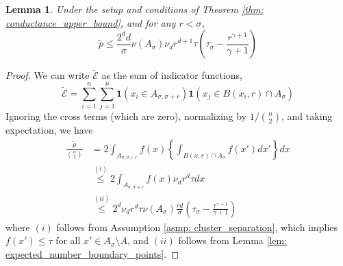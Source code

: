 \documentclass{article}
\newcommand{\Asig}{A_{\sigma}}
\newcommand{\Asigr}{A_{\sigma,\sigma + r}}
\newcommand{\1}{\mathbf{1}}
\theoremstyle{aldenthm}
\newtheorem{lemma}{Lemma}
\begin{document}
\begin{lemma}
	\label{lem: expected_density_cut}
	Under the setup and conditions of Theorem \ref{thm: conductance_upper_bound}, and for any $r < \sigma$,
	\begin{equation*}
	\widetilde{p} \leq \frac{2^d d}{\sigma} \nu(\Asig) \nu_d r^{d+1} \tau \left(\tau_{\sigma} - \frac{r^{\gamma + 1}}{\gamma + 1}\right)
	\end{equation*}
\end{lemma}
\begin{proof}
	We can write $\widetilde{\mathcal{E}}$ as the sum of indicator functions,
	\begin{equation}
	\label{eqn: density_cut_expansion}
	\widetilde{\mathcal{E}} = \sum_{i = 1}^{n} \sum_{j = 1}^{n} \1(x_i \in \Asigr) \1(x_j \in B(x_i,r) \cap \Asig)
	\end{equation}
	Ignoring the cross terms (which are zero), normalizing by $1/{n \choose 2}$, and taking expectation, we have
	\begin{align*}
	\frac{\widetilde{\mu}}{{n \choose 2}} & = 2 \int_{\Asigr} f(x) \left\{ \int_{B(x,r) \cap \Asig} f(x') dx'\right\} dx \\
	& \overset{(i)}{\leq} 2 \int_{\Asigr} f(x) \nu_d r^d \tau dx \\
	& \overset{(ii)}{\leq} 2^d \nu_d r^d \tau \nu(A_\sigma) \frac{rd}{\sigma} \left(\tau_{\sigma} - \frac{r^{\gamma + 1}}{\gamma + 1}\right) 
	\end{align*}
	where $(i)$ follows from Assumption \ref{asmp: cluster_separation}, which implies $f(x') \leq \tau$ for all $x' \in \Asig \setminus A$, and $(ii)$ follows from Lemma \ref{lem: expected_number_boundary_points}.
\end{proof}
\end{document}
